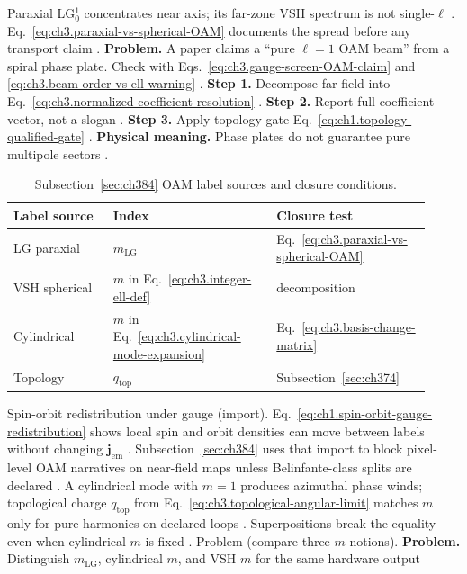 Paraxial LG\(_{0}^{1}\) concentrates near axis; its far-zone VSH spectrum is not single-\(\ell\) \cite{allen1992}.
Eq.~\eqref{eq:ch3.paraxial-vs-spherical-OAM} documents the spread before any transport claim \cite{hansen1988}.
\textbf{Problem.} A paper claims a ``pure \(\ell=1\) OAM beam'' from a spiral phase plate. Check with
Eqs.~\eqref{eq:ch3.gauge-screen-OAM-claim} and \eqref{eq:ch3.beam-order-vs-ell-warning}
\cite{allen1992}.
\textbf{Step 1.} Decompose far field into Eq.~\eqref{eq:ch3.normalized-coefficient-resolution} \cite{hansen1988}.
\textbf{Step 2.} Report full coefficient vector, not a slogan \cite{harrington2001}.
\textbf{Step 3.} Apply topology gate Eq.~\eqref{eq:ch1.topology-qualified-gate} \cite{belinfante1940}.
\textbf{Physical meaning.} Phase plates do not guarantee pure multipole sectors \cite{stratton1941}.
\begin{table}[t]
\centering
\caption{Subsection~\ref{sec:ch384} OAM label sources and closure conditions.}
\label{tab:ch3.384-OAM-sources}
\small
\begin{tabular}{@{}p{0.22\linewidth}p{0.36\linewidth}p{0.34\linewidth}@{}}
\toprule
Label source & Index & Closure test \\
\midrule
LG paraxial & \(m_{\mathrm{LG}}\) & Eq.~\eqref{eq:ch3.paraxial-vs-spherical-OAM} \\
VSH spherical & \(m\) in Eq.~\eqref{eq:ch3.integer-ell-def} & decomposition \\
Cylindrical & \(m\) in Eq.~\eqref{eq:ch3.cylindrical-mode-expansion} & Eq.~\eqref{eq:ch3.basis-change-matrix} \\
Topology & \(q_{\mathrm{top}}\) & Subsection~\ref{sec:ch374} \\
\bottomrule
\end{tabular}
\end{table}
Spin-orbit redistribution under gauge (import). Eq.~\eqref{eq:ch1.spin-orbit-gauge-redistribution} shows local spin and orbit densities can move between labels without changing
\(\mathbf{j}_{\mathrm{em}}\) \cite{belinfante1940}. Subsection~\ref{sec:ch384} uses that import to block pixel-level OAM
narratives on near-field maps unless Belinfante-class splits are declared \cite{belinfante1940}.
A cylindrical mode with \(m=1\) produces azimuthal phase winds; topological charge \(q_{\mathrm{top}}\) from
Eq.~\eqref{eq:ch3.topological-angular-limit} matches \(m\) only for pure harmonics on declared loops \cite{allen1992}.
Superpositions break the equality even when cylindrical \(m\) is fixed \cite{harrington2001}.
Problem (compare three \(m\) notions). \textbf{Problem.} Distinguish \(m_{\mathrm{LG}}\), cylindrical \(m\), and VSH \(m\) for the same hardware output
